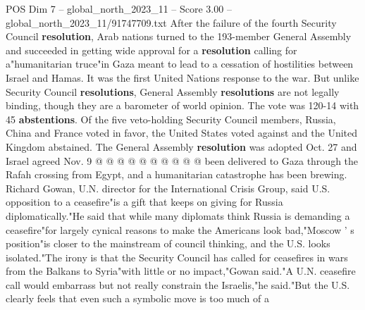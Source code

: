 \begin{textsample}{POS Dim 7 – global\_north\_2023\_11 – Score 3.00 – global\_north\_2023\_11/91747709.txt}
After the failure of the fourth Security Council \textbf{resolution}, Arab nations turned to the 193-member General Assembly and succeeded in getting wide approval for a \textbf{resolution} calling for a"humanitarian truce"in Gaza meant to lead to a cessation of hostilities between Israel and Hamas.
It was the first United Nations response to the war.
But unlike Security Council \textbf{resolutions}, General Assembly \textbf{resolutions} are not legally binding, though they are a barometer of world opinion.
The vote was 120-14 with 45 \textbf{abstentions}.
Of the five veto-holding Security Council members, Russia, China and France voted in favor, the United States voted against and the United Kingdom abstained.
The General Assembly \textbf{resolution} was adopted Oct. 27 and Israel agreed Nov. 9 @ @ @ @ @ @ @ @ @ @ been delivered to Gaza through the Rafah crossing from Egypt, and a humanitarian catastrophe has been brewing.
Richard Gowan, U.N. director for the International Crisis Group, said U.S. opposition to a ceasefire"is a gift that keeps on giving for Russia diplomatically."He said that while many diplomats think Russia is demanding a ceasefire"for largely cynical reasons to make the Americans look bad,"Moscow ' s position"is closer to the mainstream of council thinking, and the U.S. looks isolated."The irony is that the Security Council has called for ceasefires in wars from the Balkans to Syria"with little or no impact,"Gowan said."A U.N. ceasefire call would embarrass but not really constrain the Israelis,"he said."But the U.S. clearly feels that even such a symbolic move is too much of a

\end{textsample}
